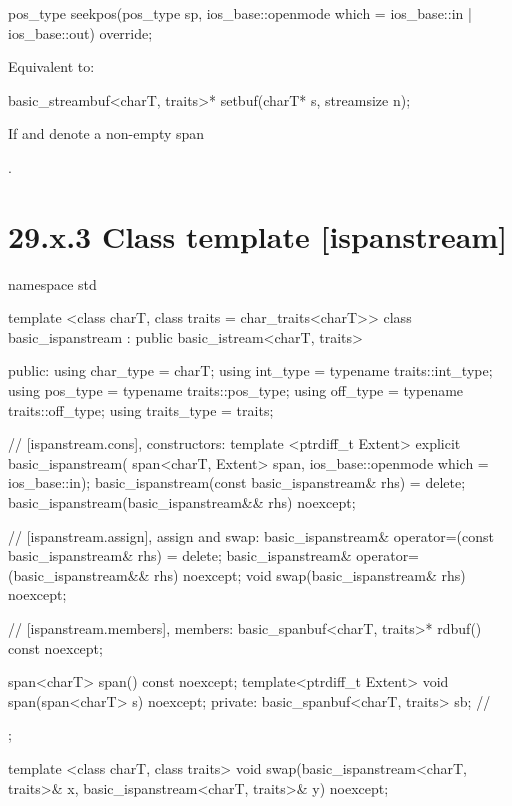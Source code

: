\documentclass[ebook,11pt,article]{memoir}
\renewcommand{\iref}[1]{[#1]}
\begin{document}
\begin{itemdecl}
pos_type seekpos(pos_type sp,
                 ios_base::openmode which
                   = ios_base::in | ios_base::out) override;
\end{itemdecl}

\begin{itemdescr}
\pnum
\effects
Equivalent to: 
\end{itemdescr}

\begin{itemdecl}
basic_streambuf<charT, traits>* setbuf(charT* s, streamsize n);
\end{itemdecl}

\begin{itemdescr}
\pnum
\effects
If  and  denote a non-empty span

\pnum
\returns
{}.
\end{itemdescr} 

\section{29.x.3 Class template  [ispanstream] }

\begin{codeblock}
namespace std {
  template <class charT, class traits = char_traits<charT>>
  class basic_ispanstream
    : public basic_istream<charT, traits> {
  public:
    using char_type      = charT;
    using int_type       = typename traits::int_type;
    using pos_type       = typename traits::pos_type;
    using off_type       = typename traits::off_type;
    using traits_type    = traits;

    // \iref{ispanstream.cons}, constructors:
    template <ptrdiff_t Extent>
    explicit basic_ispanstream(
      span<charT, Extent> span,
      ios_base::openmode which = ios_base::in);
    basic_ispanstream(const basic_ispanstream& rhs) = delete;
    basic_ispanstream(basic_ispanstream&& rhs) noexcept;

    // \iref{ispanstream.assign}, assign and swap:
    basic_ispanstream& operator=(const basic_ispanstream& rhs) = delete;
    basic_ispanstream& operator=(basic_ispanstream&& rhs) noexcept;
    void swap(basic_ispanstream& rhs) noexcept;

    // \iref{ispanstream.members}, members:
    basic_spanbuf<charT, traits>* rdbuf() const noexcept;

    span<charT> span() const noexcept;
	template<ptrdiff_t Extent>
    void span(span<charT> s) noexcept;
  private:
    basic_spanbuf<charT, traits> sb; // \expos
  };

  template <class charT, class traits>
    void swap(basic_ispanstream<charT, traits>& x,
              basic_ispanstream<charT, traits>& y) noexcept;
}
\end{codeblock}
\end{document}
